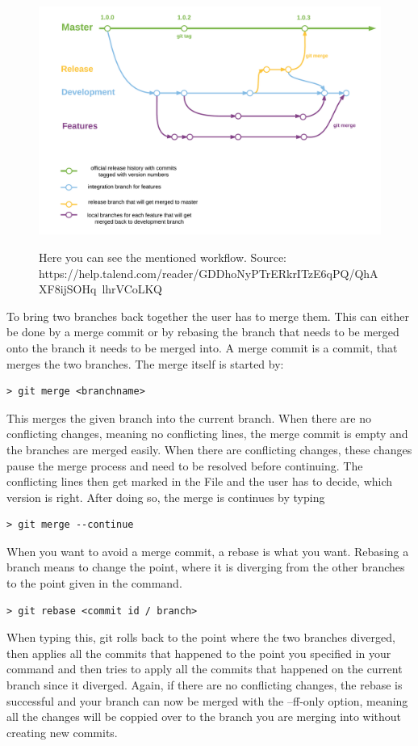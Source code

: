 \documentclass[a4paper, 12pt]{article}
\begin{document}
		\begin{figure}[h]
			\centering
			\includegraphics[width=.725\linewidth]{gitbranches.png}
			\label{fig1}
			\caption{Here you can see the mentioned workflow. Source: https://help.talend.com/reader/GDDhoNyPTrERkrITzE6qPQ/QhAXF8ijSOHq~lhrVCoLKQ}
		\end{figure}
		
		To bring two branches back together the user has to merge them. This can either be done by a merge commit or by rebasing the branch that needs to be merged onto the branch it needs to be merged into. A merge commit is a commit, that merges the two branches. The merge itself is started by:
		
		\begin{lstlisting}
> git merge <branchname>
		\end{lstlisting}
		
		This merges the given branch into the current branch. When there are no conflicting changes, meaning no conflicting lines, the merge commit is empty and the branches are merged easily. When there are conflicting changes, these changes pause the merge process and need to be resolved before continuing. The conflicting lines then get marked in the File and the user has to decide, which version is right. After doing so, the merge is continues by typing 
		
		\begin{lstlisting}
> git merge --continue
		\end{lstlisting}
		
		When you want to avoid a merge commit, a rebase is what you want. Rebasing a branch means to change the point, where it is diverging from the other branches to the point given in the command.
		
		\begin{lstlisting}
> git rebase <commit id / branch>
		\end{lstlisting}
		
		When typing this, git rolls back to the point where the two branches diverged, then applies all the commits that happened to the point you specified in your command and then tries to apply all the commits that happened on the current branch since it diverged. Again, if there are no conflicting changes, the rebase is successful and your branch can now be merged with the --ff-only option, meaning all the changes will be coppied over to the branch you are merging into without creating new commits.
		
		
		
\end{document}
